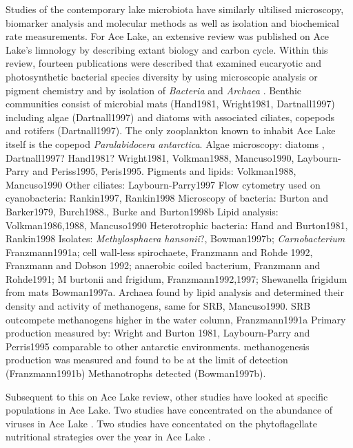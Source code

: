 Studies of the contemporary lake microbiota have similarly ultilised microscopy, biomarker analysis and molecular methods as well as isolation and biochemical rate measurements.
For Ace Lake, an extensive review was published on Ace Lake's limnology by \citet{Rankin1999} describing extant biology and carbon cycle.
Within this review, fourteen publications were described that examined eucaryotic and photosynthetic bacterial species diversity by using microscopic analysis or pigment chemistry and by isolation of \emph{Bacteria} and \emph{Archaea} \cite{Rankin1999}.
Benthic communities consist of microbial mats (Hand1981, Wright1981, Dartnall1997) including algae (Dartnall1997) and diatoms \cite{Roberts1996} with associated ciliates, copepods and rotifers (Dartnall1997).
The only zooplankton known to inhabit Ace Lake itself is the copepod \emph{Paralabidocera antarctica}.
Algae microscopy: diatoms \cite{Roberts1996}, Dartnall1997? Hand1981? Wright1981, Volkman1988, Mancuso1990, Laybourn-Parry and Periss1995, Peris1995.
Pigments and lipids: Volkman1988, Mancuso1990
Other ciliates: Laybourn-Parry1997
Flow cytometry used on cyanobacteria: Rankin1997, Rankin1998
Microscopy of bacteria: Burton and Barker1979, Burch1988., Burke and Burton1998b
Lipid analysis: Volkman1986,1988, Mancuso1990
Heterotrophic bacteria: Hand and Burton1981, Rankin1998
Isolates: \emph{Methylosphaera hansonii}?, Bowman1997b; \emph{Carnobacterium} Franzmann1991a; cell wall-less spirochaete, Franzmann and Rohde 1992, Franzmann and Dobson 1992; anaerobic coiled bacterium, Franzmann and Rohde1991; M burtonii and frigidum, Franzmann1992,1997; Shewanella frigidum from mats Bowman1997a.
Archaea found by lipid analysis and determined their density and activity of methanogens, same for SRB, Mancuso1990. 
SRB outcompete methanogens higher in the water column, Franzmann1991a
Primary production measured by: Wright and Burton 1981, Laybourn-Parry and Perris1995 comparable to other antarctic environments.
methanogenesis production was measured and found to be at the limit of detection (Franzmann1991b)
Methanotrophs detected (Bowman1997b).

Subsequent to this on Ace Lake review, other studies have looked at specific populations in Ace Lake.
Two studies have concentrated on the abundance of viruses in Ace Lake \cite{Laybourn-Parry2001, Madan2005}.
Two studies have concentated on the phytoflagellate nutritional strategies over the year in Ace Lake \cite{Bell2003, Laybourn-Parry2005}.


